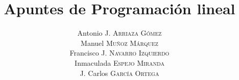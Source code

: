 \title{Apuntes de Programación lineal}
\author{Antonio J. \textsc{Arriaza Gómez}\\
Manuel \textsc{Muñoz Márquez}\\
Francisco J. \textsc{Navarro Izquierdo}\\
Inmaculada \textsc{Espejo Miranda} \\
J. Carlos \textsc{García Ortega}}



\usepackage[utf8]{inputenc}
\usepackage[spanish]{babel}

\usepackage[sfdefault,condensed]{roboto}
\usepackage[T1]{fontenc}

\usepackage{blkarray, bigstrut}
\usepackage{multirow}

\def\IR{\ensuremath{\mathbb R}}
\def\IK{\ensuremath{\mathbb K}}
\def\IC{\ensuremath{\mathbb C}}
\def\IN{\ensuremath{\mathbb N}}
\def\IZ{\ensuremath{\mathbb Z}}
\def\IQ{\ensuremath{\mathbb Q}}
\def\IA{\ensuremath{\mathbb A}}

\usepackage{multicol}
\usepackage{forloop}
\usepackage{calculator}

\def\fin{\multicolumn{1}{c}}
	
\newenvironment{simplex}[4]
{ 
	\def\myslines{} %
	\forloop{ct}{0}{\value{ct} < #1}{\expandafter\def\expandafter\myslines\expandafter{%
			\myslines r
		}
	}
	\ADD{#1}{3}{\sol}
	\begin{array}{rr|\myslines|c}
		& \multicolumn{1}{c}{} &#2&\\
		& & #3\\
		\cline{2-\sol}
		#4
		\cline{2-\sol}
		& & }
{\\\end{array}}

\graphicspath{{graficos/}}


\newenvironment{formulacion}[4][1]
{ 
  \def\myflines{} %
  \forloop{ct}{-2}{\value{ct} < #3}{\expandafter\def\expandafter\myflines\expandafter{%
      \myflines
      r
    }%
  }
  \begin{array}{c}
    #2 \quad #4\vspace*{0.3cm}\\
    \text{s.a}\;
    \left\{
    \renewcommand{\arraystretch}{1.2}
    \begin{array}{\myflines}}
      {\end{array}\right.
  \end{array}
}

\usepackage{epigraph}

\hypersetup{
  colorlinks=true,
  linkcolor=blue,
  citecolor=blue,
  filecolor=magenta,
  urlcolor=cyan
}
